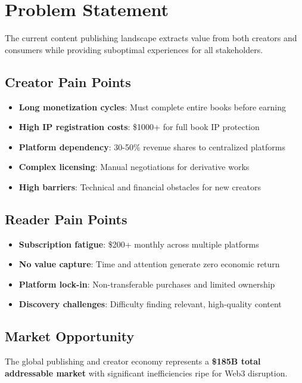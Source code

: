 \section{Problem Statement}
\label{sec:problem-statement}

The current content publishing landscape extracts value from both creators and consumers while providing suboptimal experiences for all stakeholders.

\subsection{Creator Pain Points}

\begin{itemize}
    \item \textbf{Long monetization cycles}: Must complete entire books before earning
    \item \textbf{High IP registration costs}: \$1000+ for full book IP protection
    \item \textbf{Platform dependency}: 30-50\% revenue shares to centralized platforms
    \item \textbf{Complex licensing}: Manual negotiations for derivative works
    \item \textbf{High barriers}: Technical and financial obstacles for new creators
\end{itemize}

\subsection{Reader Pain Points}

\begin{itemize}
    \item \textbf{Subscription fatigue}: \$200+ monthly across multiple platforms
    \item \textbf{No value capture}: Time and attention generate zero economic return
    \item \textbf{Platform lock-in}: Non-transferable purchases and limited ownership
    \item \textbf{Discovery challenges}: Difficulty finding relevant, high-quality content
\end{itemize}

\subsection{Market Opportunity}

The global publishing and creator economy represents a \textbf{\$185B total addressable market} with significant inefficiencies ripe for Web3 disruption.
